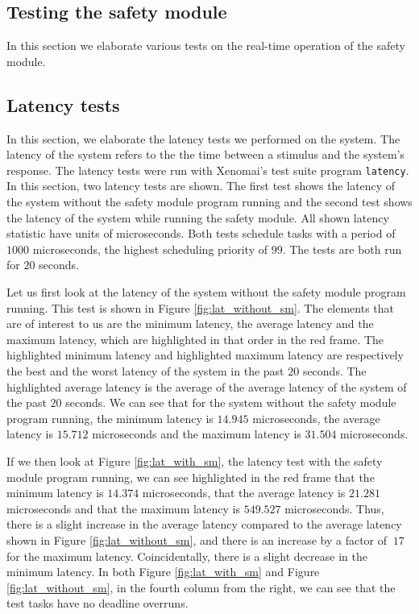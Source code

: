 \documentclass[12pt]{scrreprt}
\begin{document}
\subsection{Testing the safety module}
\label{Testing the safety module}
In this section we elaborate various tests on the real-time operation of the safety module.

\subsection{Latency tests}
\label{Latency tests}

In this section, we elaborate the latency tests we performed on the system. The latency of the system refers to the the time between a stimulus and the system's response. The latency tests were run with Xenomai's test suite program \texttt{latency}. In this section, two latency tests are shown. The first test shows the latency of the system without the safety module program running and the second test shows the latency of the system while running the safety module. All shown latency statistic have units of microseconds. Both tests schedule tasks with a period of $1000$ microseconds, the highest scheduling priority of $99$. The tests are both run for $20$ seconds. 
\par
Let us first look at the latency of the system without the safety module program running. This test is shown in Figure \ref{fig:lat_without_sm}. The elements that are of interest to us are the minimum latency, the average latency and the maximum latency, which are highlighted in that order in the red frame. The highlighted minimum latency and highlighted maximum latency are respectively the best and the worst latency of the system in the past $20$ seconds. The highlighted average latency is the average of the average latency of the system of the past $20$ seconds. We can see that for the system without the safety module program running, the minimum latency is $14.945$ microseconds, the average latency is $15.712$ microseconds and the maximum latency is $31.504$ microseconds. 
\par
If we then look at Figure \ref{fig:lat_with_sm}, the latency test with the safety module program running, we can see highlighted in the red frame that the minimum latency is $14.374$ microseconds, that the average latency is $21.281$ microseconds and that the maximum latency is $549.527$ microseconds. Thus, there is a slight increase in the average latency compared to the average latency shown in Figure \ref{fig:lat_without_sm}, and there is an increase by a factor of $~17$ for the maximum latency. Coincidentally, there is a slight decrease in the minimum latency. In both Figure \ref{fig:lat_with_sm} and Figure \ref{fig:lat_without_sm}, in the fourth column from the right, we can see that the test tasks have no deadline overruns.
\end{document}
